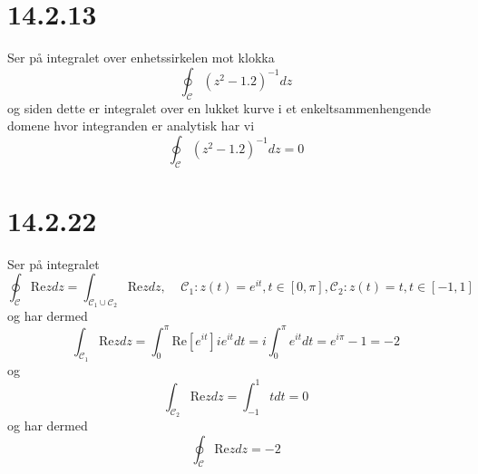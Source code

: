 \documentclass{report}
\newcommand{\nbrack}[1]{\left( #1 \right)}
\newcommand{\bbrack}[1]{\left[ #1 \right]}
\newcommand{\re}{\text{Re}}
\begin{document}
\section*{14.2.13}
Ser på integralet over enhetssirkelen mot klokka
\begin{equation}
  \label{eq:20}
  \oint_{\mathcal{C}} \nbrack{z^{2} - 1.2}^{-1} dz
\end{equation}
og siden dette er integralet over en lukket kurve i et enkeltsammenhengende domene hvor integranden er analytisk har vi
\begin{equation}
  \label{eq:22}
  \oint_{\mathcal{C}} \nbrack{z^{2} - 1.2}^{-1} dz = 0
\end{equation}

\section*{14.2.22}
Ser på integralet
\begin{equation}
  \label{eq:23}
  \oint_{\mathcal{C}} \re z dz = \int_{\mathcal{C}_{1} \cup \mathcal{C}_{2}}  \re z dz,
  \;\;\;\; \mathcal{C}_{1} : z(t) = e^{it}, t\in \bbrack{ 0, \pi }, \mathcal{C}_{2} : z(t) = t, t \in \bbrack{-1, 1}
\end{equation}
og har dermed
\begin{equation}
  \label{eq:24}
  \int_{\mathcal{C}_{1}} \re z dz = \int_{0}^{\pi} \re \bbrack{ e^{it} } ie^{it}dt = i\int_{0}^{\pi} e^{it} dt = e^{i\pi} - 1 = -2
\end{equation}
og
\begin{equation}
  \label{eq:25}
  \int_{\mathcal{C}_{2}} \re z dz = \int_{-1}^{1} t dt = 0
\end{equation}
og har dermed
\begin{equation}
  \label{eq:26}
  \oint_{\mathcal{C}} \re z dz = -2
\end{equation}
\end{document}
